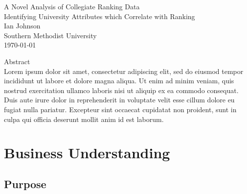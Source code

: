 \documentclass[12pt]{article}
\begin{document}
\begin{titlepage}
\vspace*{\fill}
\begin{center}
      {\Huge A Novel Analysis of Collegiate Ranking Data}\\[0.5cm]
      {\Large Identifying University Attributes which Correlate with Ranking}\\[1.0cm]
      {\Large Ian Johnson}\\[0.4cm]
      {\Large Southern Methodist University}\\[0.4cm]
      \today
\end{center}
\vspace*{\fill}
\end{titlepage}

\begin{titlepage}
\vspace*{\fill}
\begin{center}
  
      {\Large Abstract}\\[1.0cm]

     Lorem ipsum dolor sit amet, consectetur adipiscing elit, sed do eiusmod tempor incididunt ut labore et dolore magna aliqua. Ut enim ad minim veniam, quis nostrud exercitation ullamco laboris nisi ut aliquip ex ea commodo consequat. Duis aute irure dolor in reprehenderit in voluptate velit esse cillum dolore eu fugiat nulla pariatur. Excepteur sint occaecat cupidatat non proident, sunt in culpa qui officia deserunt mollit anim id est laborum.\\[3.0cm]
     
\end{center}
\vspace*{\fill}
\end{titlepage}


\section{Business Understanding}

\subsection{Purpose}
\end{document}
